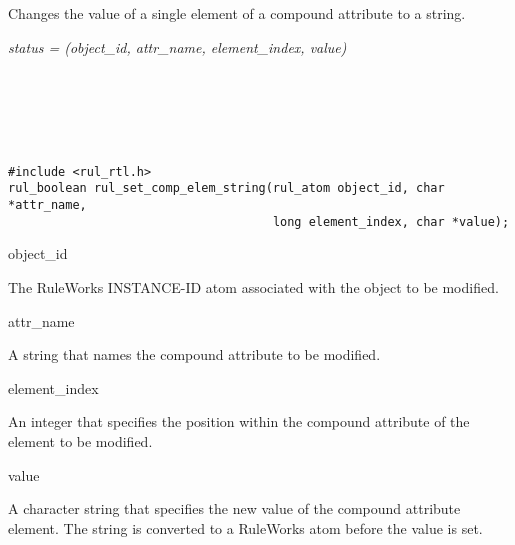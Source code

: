 \begin{seealso}




\end{seealso}

\section*{}

Changes the value of a single element of a compound attribute to a
string.

\Syntax

\it{status} = (\it{object\_id},
\it{attr\_name}, \it{element\_index}, \it{value})

\begin{args}
   \\
   \\
   \\
   \\
\end{args}

\CBinding
\begin{verbatim}
#include <rul_rtl.h>
rul_boolean rul_set_comp_elem_string(rul_atom object_id, char *attr_name,
                                     long element_index, char *value);
\end{verbatim}

\begin{arguments}
\item[object\_id]

  The RuleWorks INSTANCE-ID atom associated with the object to be
  modified.

\item[attr\_name]

  A string that names the compound attribute to be modified.

\item[element\_index]

  An integer that specifies the position within the compound attribute
  of the element to be modified.

\item[value]

  A character string that specifies the new value of the compound
  attribute element. The string is converted to a RuleWorks 
  atom before the value is set.
\end{arguments}

